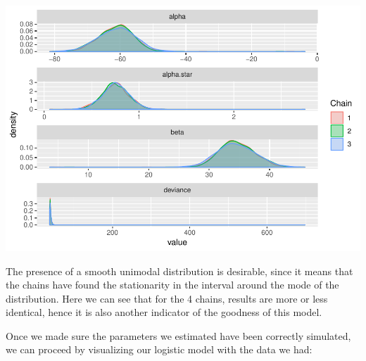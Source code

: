\documentclass[]{article}
\begin{document}
\includegraphics{FinalProject-SDSII_files/figure-latex/unnamed-chunk-12-1.pdf}

The presence of a smooth unimodal distribution is desirable, since it
means that the chains have found the stationarity in the interval around
the mode of the distribution. Here we can see that for the 4 chains,
results are more or less identical, hence it is also another indicator
of the goodness of this model.

Once we made sure the parameters we estimated have been correctly
simulated, we can proceed by visualizing our logistic model with the
data we had:
\end{document}
